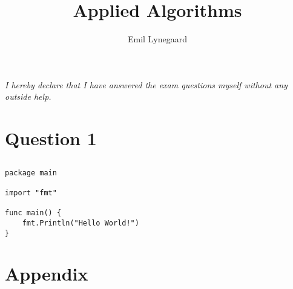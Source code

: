 \documentclass[a5paper]{article}
\title{Applied Algorithms}
\author{Emil Lynegaard}
\begin{document}


\maketitle
\textit{I hereby declare that I have answered the exam questions myself without any outside help.}\\
\newpage

\newpage
\tableofcontents
\newpage

\section{Question 1}
\subsection{}

\begin{lstlisting}
package main

import "fmt"

func main() {
    fmt.Println("Hello World!")
}
\end{lstlisting}


\section{Appendix}
%
\end{document}
